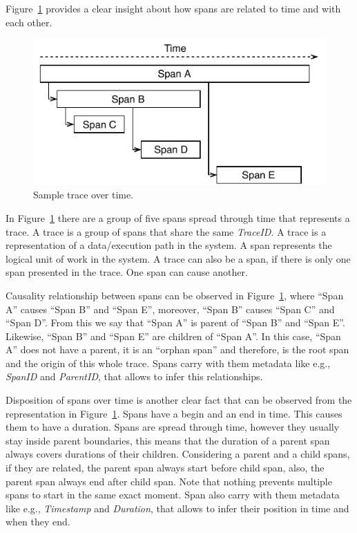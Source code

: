 
Figure~\ref{fig:sample_trace_over_time} provides a clear insight about how spans are related to time and with each other.

\begin{figure}[H]
    \centerline{\includegraphics[width=1.0\linewidth]{images/trace.pdf}}
    \caption{Sample trace over time.}
    \label{fig:sample_trace_over_time}
\end{figure}

In Figure~\ref{fig:sample_trace_over_time} there are a group of five spans spread through time that represents a trace. A trace is a group of spans that share the same \emph{TraceID}.  A trace is a representation of a data/execution path in the system. A span represents the logical unit of work in the system. A trace can also be a span, if there is only one span presented in the trace. One span can cause another.

Causality relationship between spans can be observed in Figure~\ref{fig:sample_trace_over_time}, where ``Span A'' causes ``Span B'' and ``Span E'', moreover, ``Span B'' causes ``Span C'' and ``Span D''. From this we say that ``Span A'' is parent of ``Span B'' and ``Span E''. Likewise, ``Span B'' and ``Span E'' are children of ``Span A''. In this case, ``Span A'' does not have a parent, it is an ``orphan span'' and therefore, is the root span and the origin of this whole trace. Spans carry with them metadata like e.g., \emph{SpanID} and \emph{ParentID}, that allows to infer this relationships.

Disposition of spans over time is another clear fact that can be observed from the representation in Figure~\ref{fig:sample_trace_over_time}. Spans have a begin and an end in time. This causes them to have a duration. Spans are spread through time, however they usually stay inside parent boundaries, this means that the duration of a parent span always covers durations of their children. Considering a parent and a child spans, if they are related, the parent span always start before child span, also, the parent span always end after child span. Note that nothing prevents multiple spans to start in the same exact moment. Span also carry with them metadata like e.g., \emph{Timestamp} and \emph{Duration}, that allows to infer their position in time and when they end.

